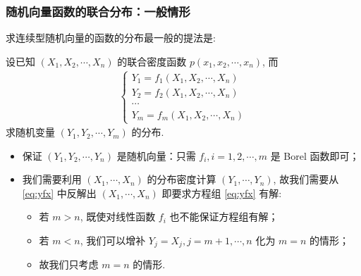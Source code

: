  \begin{frame}
 	\frametitle{随机向量函数的联合分布：一般情形}
 	求连续型随机向量的函数的分布最一般的提法是:

 	设已知 $(X_1,X_2,\cdots,X_n)$ 的联合密度函数 $p (x_1,x_2,\cdots, x_n)$, 而
 	\begin{eqnarray}
 		\label{eq:yfx}
 		\left\{
 		\begin{array}{l}
 			Y_1=f_1(X_1,X_2,\cdots,X_n)\\
 			Y_2=f_2(X_1,X_2,\cdots,X_n)\\
 			\cdots\\
 			Y_m=f_m(X_1,X_2,\cdots,X_n)
 		\end{array}
 		\right.
 	\end{eqnarray}
 	求随机变量 $(Y_1,Y_2,\cdots,Y_m)$ 的分布.

 	\pause
 	\begin{itemize}[<+-|alert@+>]
 		\item 保证 $(Y_1,Y_2,\cdots, Y_n)$ 是随机向量：只需 $f_i, i=1,2,\cdots, m$ 是 Borel 函数即可；
 		\item 我们需要利用 $(X_1,\cdots, X_n)$ 的分布密度计算 $(Y_1,\cdots,Y_n)$, 故我们需要从 \eqref{eq:yfx} 中反解出 $(X_1,\cdots,X_n)$ 即要求方程组 \eqref{eq:yfx} 有解:
 		\begin{itemize}
 			\item 若 $m>n$, 既使对线性函数 $f_i$ 也不能保证方程组有解；
 			\item 若 $m<n$, 我们可以增补 $Y_j=X_j, j=m+1,\cdots, n$ 化为 $m=n$ 的情形；
 			\item 故我们只考虑 $m=n$ 的情形.
 		\end{itemize}

 	\end{itemize}

 \end{frame}

